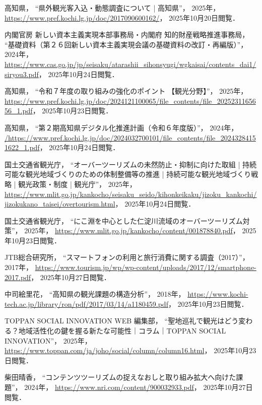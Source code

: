 \documentclass{docs}
\begin{document}
\begin{thebibliography}{99}
	高知県，
	“県外観光客入込・動態調査について | 高知県”，
	2025年，
	\url{https://www.pref.kochi.lg.jp/doc/2017090600162/}，
	2025年10月20日閲覧．

	内閣官房 新しい資本主義実現本部事務局・内閣府 知的財産戦略推進事務局，
	“基礎資料（第２６回新しい資本主義実現会議の基礎資料の改訂・再編版）”，
	2024年，
	\url{https://www.cas.go.jp/jp/seisaku/atarashii_sihonsyugi/wgkaisai/contents_dai1/siryou3.pdf}，
	2025年10月24日閲覧．

	高知県，
	“令和７年度の取り組みの強化のポイント 【観光分野】”，
	2025年，
	\url{https://www.pref.kochi.lg.jp/doc/2024121100065/file_contents/file_2025231165656_1.pdf}，
	2025年10月23日閲覧．

	高知県，
	“第２期高知県デジタル化推進計画（令和６年度版）”，
	2024年，
	\url{/https://www.pref.kochi.lg.jp/doc/2024032700101/file_contents/file_20243284151622_1.pdf}，
	2025年10月24日閲覧．

	国土交通省観光庁，
	“オーバーツーリズムの未然防止・抑制に向けた取組 | 持続可能な観光地域づくりのための体制整備等の推進 | 持続可能な観光地域づくり戦略 | 観光政策・制度 | 観光庁”，
	2025年，
	\url{https://www.mlit.go.jp/kankocho/seisaku_seido/kihonkeikaku/jizoku_kankochi/jizokukano_taisei/overtourism.html}，
	2025年10月24日閲覧．

	国土交通省観光庁，
	“にこ淵を中心とした仁淀川流域のオーバーツーリズム対策”，
	2025年，
	\url{https://www.mlit.go.jp/kankocho/content/001878840.pdf}，
	2025年10月23日閲覧．

	JTB総合研究所，
	“スマートフォンの利用と旅行消費に関する調査（2017）”，
	2017年，
	\url{https://www.tourism.jp/wp/wp-content/uploads/2017/12/smartphone-2017.pdf}，
	2025年10月27日閲覧．

	中司絵里花，
	“高知県の観光課題の構造分析”，
	2018年，
	\url{https://www.kochi-tech.ac.jp/library/ron/pdf/2017/03/14/a1180459.pdf}，
	2025年10月23日閲覧．

	TOPPAN SOCIAL INNOVATION WEB 編集部，
	“聖地巡礼で観光はどう変わる？地域活性化の鍵を握る新たな可能性｜コラム｜TOPPAN SOCIAL INNOVATION”，
	2025年，
	\url{https://www.toppan.com/ja/joho/social/column/column16.html}，
	2025年10月23日閲覧．

	柴田晴香，
	“コンテンツツーリズムの捉えなおしと取り組み拡大へ向けた課題”，
	2024年，
	\url{https://www.nri.com/content/900032933.pdf}，
	2025年10月27日閲覧．
\end{thebibliography}
\end{document}
